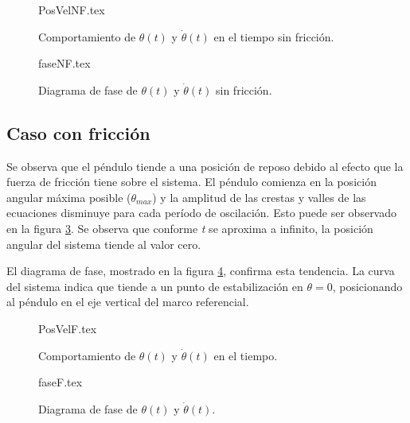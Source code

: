 \begin{figure}[htb!]
 \centering 
 {PosVelNF.tex}
 \caption{Comportamiento de $\theta(t)$ y $\dot{\theta}(t)$ en el tiempo sin fricción.}
 \label{fig: time plot theta dtheta no friction}
\end{figure}

\begin{figure}[htb!]
 \centering 
 {faseNF.tex}
\caption{Diagrama de fase de $\theta(t)$ y $\dot{\theta}(t)$ sin fricción.}
 \label{fig: phase plot theta no friction}
\end{figure}

\pagebreak

\subsection{Caso con fricción}

Se observa que el péndulo tiende a una posición de reposo debido
al efecto que la fuerza de fricción tiene sobre el sistema.
El péndulo comienza en la posición angular máxima posible 
($\theta_{max}$) y la amplitud de las crestas y valles de las 
ecuaciones disminuye para cada período de oscilación. 
Esto puede ser observado en la figura \ref{fig: time plot theta dtheta friction}.
Se observa que conforme \emph{t} se aproxima a infinito, 
la posición angular del sistema tiende al valor cero.


El diagrama de fase, mostrado en la figura 
\ref{fig: phase plot theta friction}, confirma esta tendencia.
La curva del sistema indica que tiende 
a un punto de estabilización en $\theta = 0$,
posicionando al péndulo en el eje vertical 
del marco referencial.

\begin{figure}[htb!]
 \centering 
 {PosVelF.tex}
 \caption{Comportamiento de $\theta(t)$ y $\dot{\theta}(t)$ en el tiempo.}
 \label{fig: time plot theta dtheta friction}
\end{figure}

\begin{figure}[htb!]
 \centering 
 {faseF.tex}
\caption{Diagrama de fase de $\theta(t)$ y $\dot{\theta}(t)$.}
 \label{fig: phase plot theta friction}
\end{figure}

